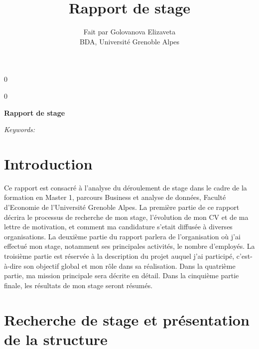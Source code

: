 \documentclass[12pt]{article}
\newcommand{\blind}{0}
\begin{document}
\def\spacingset#1{\renewcommand{\baselinestretch}%
{#1}\small\normalsize} \spacingset{1}



\blind
{
  \title{\bf Rapport de stage}

  \author{
        Fait par Golovanova Elizaveta \\
    BDA, Université Grenoble Alpes\\
      }
  \maketitle
} \fi

\blind
{
  \bigskip
  \bigskip
  \bigskip
  \begin{center}
    {\LARGE\bf Rapport de stage}
  \end{center}
  \medskip
} \fi

\bigskip
\begin{abstract}

\end{abstract}

\noindent%
{\it Keywords:} 
\vfill

\newpage
\spacingset{1.45} %

\newpage
\tableofcontents 
\newpage

\hypertarget{introduction}{%
\section{Introduction}\label{introduction}}

Ce rapport est consacré à l'analyse du déroulement de stage dans le
cadre de la formation en Master 1, parcours Business et analyse de
données, Faculté d'Economie de l'Université Grenoble Alpes. La première
partie de ce rapport décrira le processus de recherche de mon stage,
l'évolution de mon CV et de ma lettre de motivation, et comment ma
candidature s'etait diffusée à diverses organisations. La deuxième
partie du rapport parlera de l'organisation où j'ai effectué mon stage,
notamment ses principales activités, le nombre d'employés. La troisième
partie est réservée à la description du projet auquel j'ai participé,
c'est-à-dire son objectif global et mon rôle dans sa réalisation. Dans
la quatrième partie, ma mission principale sera décrite en détail. Dans
la cinquième partie finale, les résultats de mon stage seront résumés.

\section{Recherche de stage et présentation de la structure}
\label{sec:first}
\end{document}

